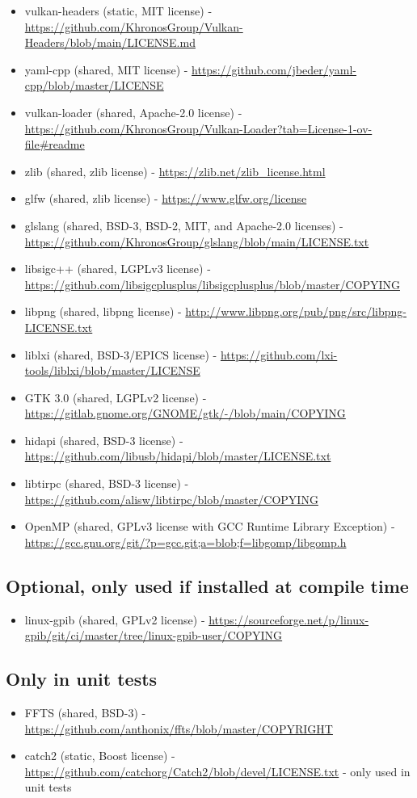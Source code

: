 \begin{itemize}
\item vulkan-headers (static, MIT license) - \url{https://github.com/KhronosGroup/Vulkan-Headers/blob/main/LICENSE.md}
\item yaml-cpp (shared, MIT license) - \url{https://github.com/jbeder/yaml-cpp/blob/master/LICENSE}
\item vulkan-loader (shared, Apache-2.0 license) - \url{https://github.com/KhronosGroup/Vulkan-Loader?tab=License-1-ov-file#readme}
\item zlib (shared, zlib license) - \url{https://zlib.net/zlib_license.html}
\item glfw (shared, zlib license) - \url{https://www.glfw.org/license}
\item glslang (shared, BSD-3, BSD-2, MIT, and Apache-2.0 licenses) - \url{https://github.com/KhronosGroup/glslang/blob/main/LICENSE.txt}
\item libsigc++ (shared, LGPLv3 license) - \url{https://github.com/libsigcplusplus/libsigcplusplus/blob/master/COPYING}
\item libpng (shared, libpng license) - \url{http://www.libpng.org/pub/png/src/libpng-LICENSE.txt}
\item liblxi (shared, BSD-3/EPICS license) - \url{https://github.com/lxi-tools/liblxi/blob/master/LICENSE}
\item GTK 3.0 (shared, LGPLv2 license) - \url{https://gitlab.gnome.org/GNOME/gtk/-/blob/main/COPYING}
\item hidapi (shared, BSD-3 license) - \url{https://github.com/libusb/hidapi/blob/master/LICENSE.txt}
\item libtirpc (shared, BSD-3 license) - \url{https://github.com/alisw/libtirpc/blob/master/COPYING}
\item OpenMP (shared, GPLv3 license with GCC Runtime Library Exception) - \url{https://gcc.gnu.org/git/?p=gcc.git;a=blob;f=libgomp/libgomp.h}
\end{itemize}

\subsection{Optional, only used if installed at compile time}
\begin{itemize}
\item linux-gpib (shared, GPLv2 license) - \url{https://sourceforge.net/p/linux-gpib/git/ci/master/tree/linux-gpib-user/COPYING}
\end{itemize}

\subsection{Only in unit tests}
\begin{itemize}
\item FFTS (shared, BSD-3) - \url{https://github.com/anthonix/ffts/blob/master/COPYRIGHT}
\item catch2 (static, Boost license) - \url{https://github.com/catchorg/Catch2/blob/devel/LICENSE.txt} - only used in unit tests
\end{itemize}
